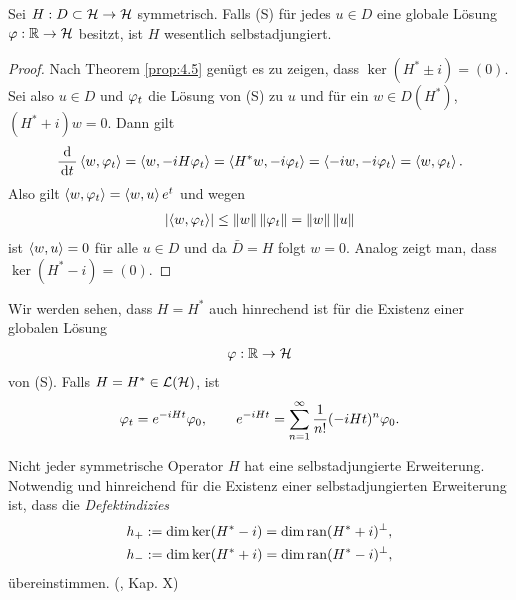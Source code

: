\begin{prop}
\label{prop:4.7}
Sei $H:D\subset\mathcal{H}\to\mathcal{H}$ symmetrisch. Falls (S) für jedes $u\in D$ eine globale
Lösung $\varphi: \mathbb{R}\to \mathcal{H}$ besitzt, ist $H$ wesentlich selbstadjungiert.\fishhere
\end{prop}
\begin{proof}
Nach Theorem \ref{prop:4.5} genügt es zu zeigen, dass $\ker(H^*\pm i)=(0)$. Sei
also $u\in D$ und $\varphi_t$ die Lösung von (S) zu $u$ und für ein $w\in D(H^*)$,
$(H^*+i)w =0$. Dann gilt
\begin{align*}
\frac{\mathrm{d}}{\,\mathrm{d} t\,}\left\langle w,\varphi_t\right\rangle
= \left\langle w,-iH\varphi_t\right\rangle = \left\langle H^*w,-i\varphi_t\right\rangle = \left\langle-iw,-i\varphi_t\right\rangle =
\left\langle w,\varphi_t\right\rangle.
\end{align*}
Also gilt $\left\langle w,\varphi_t\right\rangle = \left\langle w,u\right\rangle e^t$ und wegen
\begin{align*}
\left|\left\langle w,\varphi_t\right\rangle\right| \le \left\|w\right\|\left\|\varphi_t\right\| = \left\|w\right\|\left\|u\right\|
\end{align*}
ist $\left\langle w,u\right\rangle = 0$ für alle $u\in D$ und da $\bar{D}=H$ folgt $w=0$. Analog
zeigt man, dass $\ker(H^*-i)=(0)$.\qedhere
\end{proof}

\begin{bem*}[Bemerkungen]
\begin{bemenum}
\item Wir werden sehen, dass $H=H^*$ auch hinrechend ist für die Existenz einer
globalen Lösung
\begin{align*}
\varphi: \mathbb{R}\to \mathcal{H}
\end{align*}
von (S). Falls $H=H^*\in\mathcal{L}(\mathcal{H})$, ist
\begin{align*}
\varphi_t = e^{-iHt}\varphi_0,\qquad
e^{-iHt} = \sum_{n=1}^\infty \frac{1}{n!} (-iHt)^n\varphi_0.
\end{align*}
\item Nicht jeder symmetrische Operator $H$ hat eine selbstadjungierte
Erweiterung. Notwendig und hinreichend für die Existenz einer selbstadjungierten
Erweiterung ist, dass die \emph{Defektindizies}
\begin{align*}
&h_+ := \dim \ker(H^*-i) = \dim \operatorname{ran}(H^*+i)^\bot,\\
&h_- := \dim \ker(H^*+i) = \dim \operatorname{ran}(H^*-i)^\bot,
\end{align*}
übereinstimmen. (\cite{RS05a}, Kap. X)\maphere
\end{bemenum}
\end{bem*}
